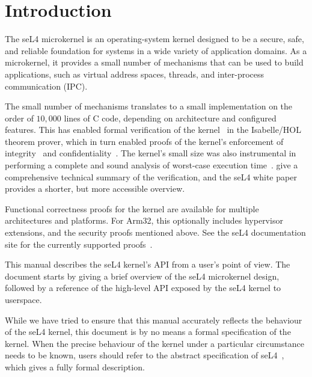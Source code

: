 %
%
%

\chapter{\label{ch:intro}Introduction}


The seL4 microkernel is an operating-system kernel designed to be a secure,
safe, and reliable foundation for systems in a wide variety of application
domains. As a microkernel, it provides a small number of mechanisms that can be
used to build applications, such as virtual address spaces, threads, and
inter-process communication (IPC).

The small number of mechanisms translates to a small implementation on the order
of $10,000$ lines of C code, depending on architecture and configured features.
This has enabled formal verification of the
kernel~\cite{Boyton_09,Cock_KS_08,Derrin_EKCC_06,Elkaduwe_KE_08,Klein_EHACDEEKNSTW_09,Tuch_KN_07,Winwood_KSACN_09}
in the Isabelle/HOL theorem prover, which in turn enabled proofs of the kernel's
enforcement of integrity~\cite{Sewell_WGMAK_11} and
confidentiality~\cite{Murray_MBGBSLGK_13}. The kernel's small size was also
instrumental in performing a complete and sound analysis of worst-case execution
time~\cite{Blackham_SCRH_11,Blackham_SH_12}. \citet{Klein_AEMSKH_14} give a
comprehensive technical summary of the verification, and the seL4 white
paper~\cite{whitepaper} provides a shorter, but more accessible overview.

Functional correctness proofs for the kernel are available for multiple
architectures and platforms. For Arm32, this optionally includes hypervisor
extensions, and the security proofs mentioned above. See the seL4 documentation
site for the currently supported proofs~\cite{doc_site_proofs}.

This manual describes the seL4 kernel's API from a user's point of view. The
document starts by giving a brief overview of the seL4 microkernel design,
followed by a reference of the high-level API exposed by the seL4 kernel to
userspace.

While we have tried to ensure that this manual accurately reflects the behaviour
of the seL4 kernel, this document is by no means a formal specification of the
kernel. When the precise behaviour of the kernel under a particular circumstance
needs to be known, users should refer to the abstract specification of
seL4~\cite{seL4_spec}, which gives a fully formal description.
